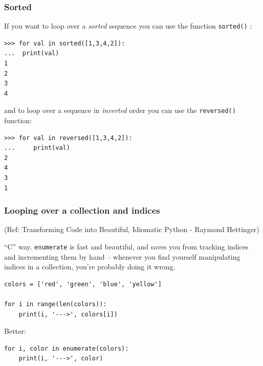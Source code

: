 \begin{frame}[fragile]\frametitle{Sorted}

  If you want to loop over a \textit{sorted} sequence you can use the
  function \texttt{sorted()} :

  \begin{lstlisting}
>>> for val in sorted([1,3,4,2]):
...  print(val)
1
2
3
4
  \end{lstlisting}

and to loop over a sequence in \textit{inverted} order you can use the
\texttt{reversed()} function:

\begin{lstlisting}
>>> for val in reversed([1,3,4,2]):
...     print(val)
2
4
3
1
\end{lstlisting}

\end{frame}

\begin{frame}[fragile]\frametitle{Looping over a collection and indices}
\tiny{(Ref: Transforming Code into Beautiful, Idiomatic Python -  Raymond Hettinger)}

``C'' way. \texttt{enumerate} is fast and beautiful, and saves you from tracking indices and incrementing them by hand -- whenever you find yourself manipulating indices in a collection, you're probably doing it wrong.
\begin{lstlisting}
colors = ['red', 'green', 'blue', 'yellow']

for i in range(len(colors)):
    print(i, '--->', colors[i])
\end{lstlisting}
Better:
\begin{lstlisting}
for i, color in enumerate(colors):
    print(i, '--->', color)
\end{lstlisting}
\end{frame}

